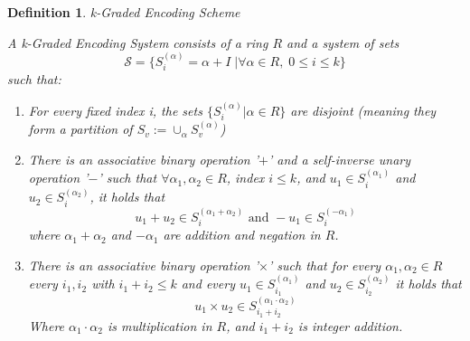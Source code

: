 \documentclass[12pt,twoside]{reedthesis}
\newtheorem{definition}{Definition}
\begin{document}
    \begin{definition}{k-Graded Encoding Scheme}
    \par A k-Graded Encoding System consists of a ring $R$ and a system of sets $$\mathcal{S}= \{S_i^{(\alpha)} = \alpha + I \; | \forall \alpha \in R, \; 0 \leq i \leq k \}$$ such that:
    \begin{enumerate}
    \item For every fixed index i, the sets $\{S_i^{(\alpha)}| \alpha \in R \}$ are disjoint (meaning they form a partition of $S_v := \cup_\alpha S_v^{(\alpha)}$)
    
    \item There is an associative binary operation '$ + $' and a self-inverse unary operation '$-$' such that $\forall \alpha_1,\alpha_2 \in R$, index $i\leq k$, and $u_1 \in S_i^{(\alpha_1)}$ and $u_2 \in S_i^{(\alpha_2)}$, it holds that 
    $$u_1 + u_2 \in S_i^{(\alpha_1 + \alpha_2)} \text{ and } -u_1 \in S_i^{(-\alpha_1)}$$
    where $\alpha_1 + \alpha_2$ and $-\alpha_1$ are addition and negation in $R$.
    
    \item There is an associative binary operation '$\times$' such that for every $\alpha_1,\alpha_2 \in R$ every $i_1,i_2$ with $i_1+i_2 \leq k$ and every $u_1 \in S_{i_1}^{(\alpha_1)}$ and $u_2 \in S_{i_2}^{(\alpha_2)}$ it holds that 
    $$u_1 \times u_2 \in S_{i_1 + i_2}^{(\alpha_1 \cdot \alpha_2)} $$
    Where $\alpha_1 \cdot \alpha_2$ is multiplication in $R$, and $i_1 + i_2$ is integer addition.
    \end{enumerate}
    \end{definition}

    
 
  
    
     
         
    
\end{document}
